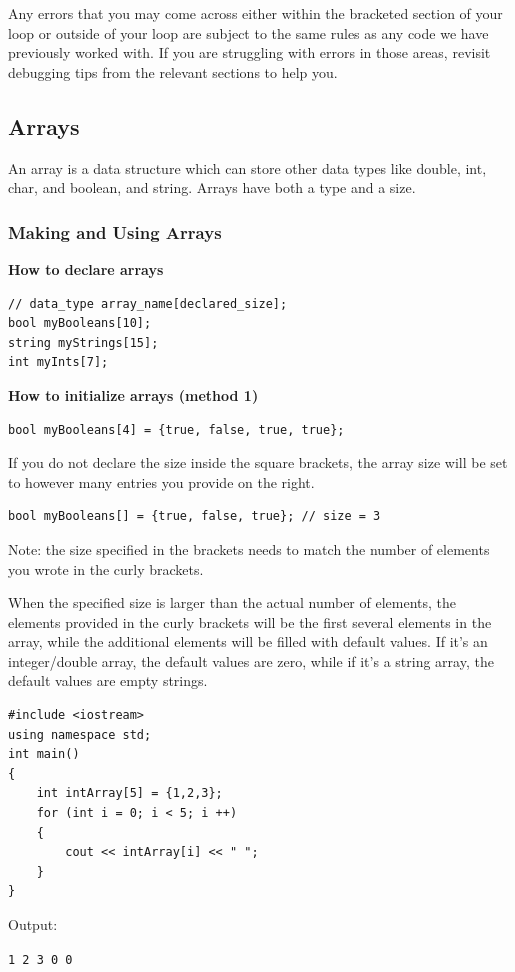 Any errors that you may come across either within the bracketed section of your loop or outside of your loop are subject to the same rules as any code we have previously worked with. If you are struggling with errors in those areas, revisit debugging tips from the relevant sections to help you. 

\subsection{Arrays}
An array is a data structure which can store other data types like double, int, char, and boolean, and string. Arrays have both a type and a size.

\subsubsection{Making and Using Arrays}

\textbf{How to declare arrays}
\begin{verbatim}
// data_type array_name[declared_size];
bool myBooleans[10];
string myStrings[15];
int myInts[7];
\end{verbatim}

\textbf{How to initialize arrays (method 1)}
\begin{verbatim}
bool myBooleans[4] = {true, false, true, true};
\end{verbatim}

If you do not declare the size inside the square brackets, the array size will be set to however many entries you provide on the right.

\begin{verbatim}
bool myBooleans[] = {true, false, true}; // size = 3
\end{verbatim}

Note: the size specified in the brackets needs to match the number of elements you wrote in the curly brackets.

\begin{example}
    When the specified size is larger than the actual number of elements, the elements provided in the curly brackets will be the first several elements in the array, while the additional elements will be filled with default values. If it’s an integer/double array, the default values are zero, while if it’s a string array, the default values are empty strings.
    \begin{verbatim}
#include <iostream>
using namespace std;
int main()
{
    int intArray[5] = {1,2,3};
    for (int i = 0; i < 5; i ++)
    {
        cout << intArray[i] << " ";
    }
}
    \end{verbatim}

    Output:

    \texttt{1 2 3 0 0}
\end{example}

